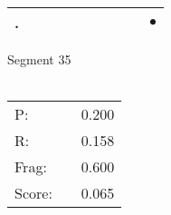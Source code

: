 \documentclass[landscape]{article}
\newcommand{\ssp}{\hspace{2pt}}
\newcommand{\mex}{\cellcolor{g}$\bullet$}
\begin{document}
\begin{tabular}{|l|p{10pt}|p{10pt}|p{10pt}|p{10pt}|p{10pt}|p{10pt}|p{10pt}|p{10pt}|p{10pt}|}
\hline
\ssp \cellcolor{ref8}. \ssp&\hspace{2pt}&\hspace{2pt}&\hspace{2pt}&\hspace{2pt}&\hspace{2pt}&\hspace{2pt}&\hspace{2pt}&\hspace{2pt}&\hspace{2pt}\mex\\
\hline
\end{tabular}

\vspace{6pt}
\noindent Segment 35\\\\
\noindent\begin{tabular}{lm{12pt}r}
\hline
P:&&0.200\\
R:&&0.158\\
Frag:&&0.600\\
Score:&&0.065\\
\end{tabular}

\newpage
\end{document}
